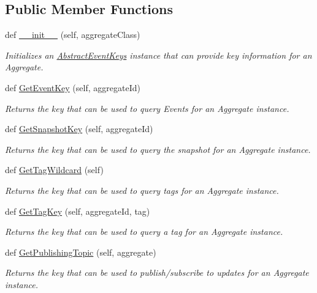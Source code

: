\subsection*{Public Member Functions}
\begin{DoxyCompactItemize}
\item 
def \hyperlink{group__Chronos_ga019962482c2abdb3ca590c5bb62a1d2c}{\+\_\+\+\_\+init\+\_\+\+\_\+} (self, aggregate\+Class)
\begin{DoxyCompactList}\small\item\em Initializes an \hyperlink{classChronos_1_1Infrastructure_1_1AbstractEventKeys}{Abstract\+Event\+Keys} instance that can provide key information for an Aggregate. \end{DoxyCompactList}\item 
def \hyperlink{group__Chronos_gae344da5f301d8e117652a50fdbf880b3}{Get\+Event\+Key} (self, aggregate\+Id)
\begin{DoxyCompactList}\small\item\em Returns the key that can be used to query Events for an Aggregate instance. \end{DoxyCompactList}\item 
def \hyperlink{group__Chronos_gaea065e98844ec3d197f7073282e77904}{Get\+Snapshot\+Key} (self, aggregate\+Id)
\begin{DoxyCompactList}\small\item\em Returns the key that can be used to query the snapshot for an Aggregate instance. \end{DoxyCompactList}\item 
def \hyperlink{group__Chronos_ga8c42a79952d93373b91ac1af682beb6d}{Get\+Tag\+Wildcard} (self)
\begin{DoxyCompactList}\small\item\em Returns the key that can be used to query tags for an Aggregate instance. \end{DoxyCompactList}\item 
def \hyperlink{group__Chronos_ga60f250ee6e509e9bcc5626e154a40b8f}{Get\+Tag\+Key} (self, aggregate\+Id, tag)
\begin{DoxyCompactList}\small\item\em Returns the key that can be used to query a tag for an Aggregate instance. \end{DoxyCompactList}\item 
def \hyperlink{group__Chronos_ga09c352e9895b9ef04abfa95785a9c183}{Get\+Publishing\+Topic} (self, aggregate)
\begin{DoxyCompactList}\small\item\em Returns the key that can be used to publish/subscribe to updates for an Aggregate instance. \end{DoxyCompactList}\item 

\end{DoxyCompactItemize}
